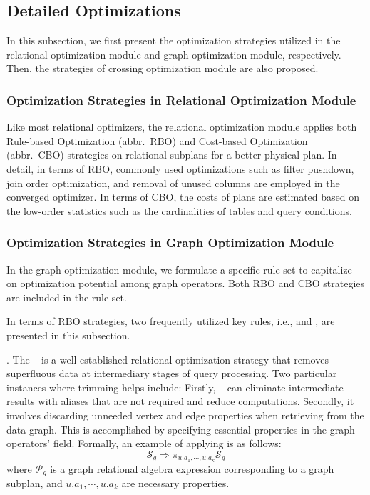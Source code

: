 \subsection{Detailed Optimizations}
\label{sec:framework:detailed-optimizations}

In this subsection, we first present the optimization strategies utilized in the relational optimization module and graph optimization module, respectively.
Then, the strategies of crossing optimization module are also proposed.

\subsubsection{Optimization Strategies in Relational Optimization Module}

Like most relational optimizers, the relational optimization module applies both Rule-based Optimization (abbr.~RBO) and Cost-based Optimization (abbr.~CBO) strategies on relational subplans for a better physical plan.
In detail, in terms of RBO, commonly used optimizations such as filter pushdown, join order optimization, and removal of unused columns are employed in the converged optimizer.
In terms of CBO, the costs of plans are estimated based on the low-order statistics such as the cardinalities of tables and query conditions.



\subsubsection{Optimization Strategies in Graph Optimization Module}

In the graph optimization module, we formulate a specific rule set to capitalize on optimization potential among graph operators. 
Both RBO and CBO strategies are included in the rule set.

In terms of RBO strategies, two frequently utilized key rules, i.e., \trimrule and \fusionrule, are presented in this subsection.

\trimrule. 
The \trimrule~ is a well-established relational optimization strategy that removes superfluous data at intermediary stages of query processing. 
Two particular instances where trimming helps include: 
Firstly, \trimrule~ can eliminate intermediate results with aliases that are not required and reduce computations.
Secondly, it involves discarding unneeded vertex and edge properties when retrieving from the data graph. 
This is accomplished by specifying essential properties in the graph operators’  field.
Formally, an example of applying \trimrule is as follows:
\begin{equation}
    \mathcal{S}_g \Rightarrow \pi_{u.a_1, \cdots, u.a_k}\mathcal{S} _g 
\end{equation}
where $\mathcal{P}_g$ is a graph relational algebra expression corresponding to a graph subplan, and $u.a_1, \cdots, u.a_k$ are necessary properties.


